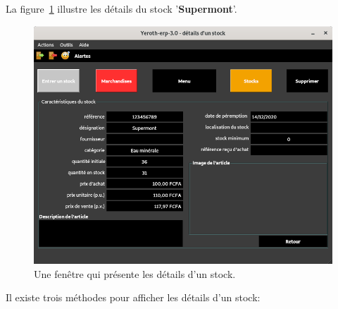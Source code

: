 \newpage
{}

La figure~\ref{fig:fenetre-details-stock} illustre
les d\'etails du stock '\textbf{Supermont}'.\\

\begin{figure}[!htbp]
	\centering
	\includegraphics[scale=0.63]{images/yeren-fenetre-detail-stock.png}
	\caption{Une fen\^etre qui pr\'esente les d\'etails d'un stock.}
	\label{fig:fenetre-details-stock}
\end{figure}

Il existe trois m\'ethodes pour afficher les d\'etails
d'un stock:

